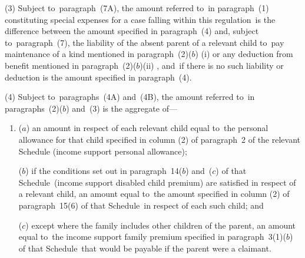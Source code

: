 \documentclass[12pt,a4paper]{article}
\begin{document}
(3) 
Subject to~paragraph~(7A),  %
the amount referred to~in paragraph~(1) constituting special expenses for a case falling within this regulation~is the difference between the amount specified in paragraph~(4) and, subject to~paragraph~(7), the liability of the absent parent of a relevant child to~pay maintenance of a kind mentioned in paragraph~(2)($b$)%
(i) or any deduction from benefit mentioned in paragraph~(2)($b$)(ii)%
, and~if there is no such liability 
or deduction  %
is the amount specified in paragraph~(4).

(4) 
Subject to~paragraphs~(4A) and~(4B),  %
the amount referred to~in paragraphs~(2)($b$) and~(3) is the aggregate of—
\begin{enumerate}\item[]
($a$) an amount in respect of each relevant child equal to~the personal allowance
for that child specified in column (2) of paragraph~2 of the relevant Schedule
(income support personal allowance);

($b$) if the conditions set out in paragraph~14($b$) and~($c$) 
of  %
that Schedule~(income support disabled child premium) are satisfied in respect of a relevant child, an amount equal to~the amount specified in column (2) of paragraph~15(6) of that Schedule~in respect of each such child;
and~ %


%

($c$) except where the family includes other children of the parent, an amount equal to~the income support family premium specified in paragraph~3(1)($b$) of that Schedule~that would be payable if the parent were a claimant.


\end{enumerate}
\end{document}
